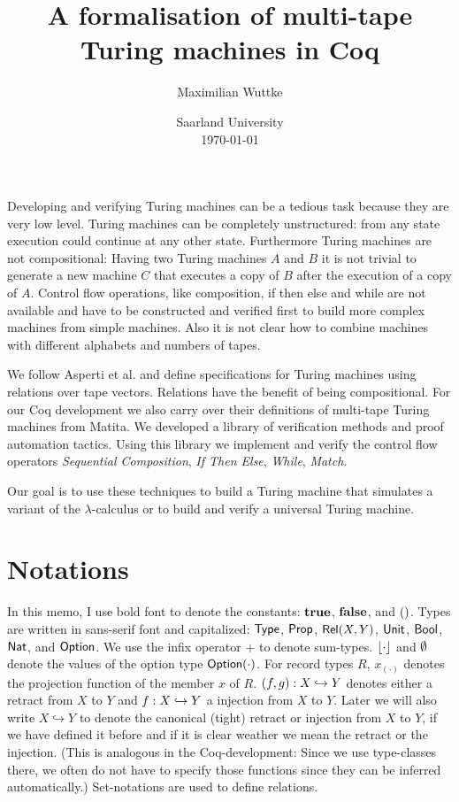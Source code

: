 \documentclass{psartcl}
\begin{document}
\title{A formalisation of multi-tape \\ Turing machines in Coq}
\author{Maximilian Wuttke}
\date{Saarland University\\\today}
\maketitle

\begin{abstract}
  \noindent
\end{abstract}
Developing and verifying Turing machines can be a tedious task because they are very low level.  Turing machines can be completely unstructured: from
any state execution could continue at any other state.  Furthermore Turing machines are not compositional:  Having two Turing machines $A$ and $B$ it
is not trivial to generate a new machine $C$ that executes a copy of $B$ after the execution of a copy of $A$.  Control flow operations, like
composition, if then else and while are not available and have to be constructed and verified first to build more complex machines from simple
machines.  Also it is not clear how to combine machines with different alphabets and numbers of tapes.

We follow Asperti et al. and define specifications for Turing machines using relations over tape vectors.  Relations have the benefit of being
compositional.  For our Coq development we also carry over their definitions of multi-tape Turing machines from Matita.  We developed a library of
verification methods and proof automation tactics.  Using this library we implement and verify the control flow operators \emph{Sequential
Composition}, \emph{If Then Else}, \emph{While}, \emph{Match}.

Our goal is to use these techniques to build a Turing machine that simulates a variant of the $\lambda$-calculus or to build and verify a universal
Turing machine.

\section{Notations}
In this memo, I use bold font to denote the constants: $\mathbf{true}$, $\mathbf{false}$, and $\mathbf{()}$.  Types are written in sans-serif font and capitalized: $\textsf{Type}$,
$\textsf{Prop}$, $\mathsf{Rel}(X, Y)$, $\textsf{Unit}$, $\textsf{Bool}$, $\textsf{Nat}$, and $\textsf{Option}$.  We use the infix operator $+$ to denote sum-types.  $\left\lfloor {\cdot}\right\rfloor$ and $\emptyset$ denote
the values of the option type $\textsf{Option}(\cdot)$.  For record types $R$, $x_{(\cdot)}$ denotes the projection function of the member $x$ of $R$.
$(f, g) : X \hookrightarrow Y$ denotes either a retract from $X$ to $Y$ and $f : X \hookrightarrow Y$ a injection from $X$ to $Y$.
Later we will also write $X \hookrightarrow Y$ to denote the canonical (tight) retract or injection from $X$ to $Y$, if we have defined it before and
if it is clear weather we mean the retract or the injection.  (This is analogous in the Coq-development:  Since we use type-classes there, we often
do not have to specify those functions since they can be inferred automatically.)  Set-notations are used to define relations.
\end{document}
